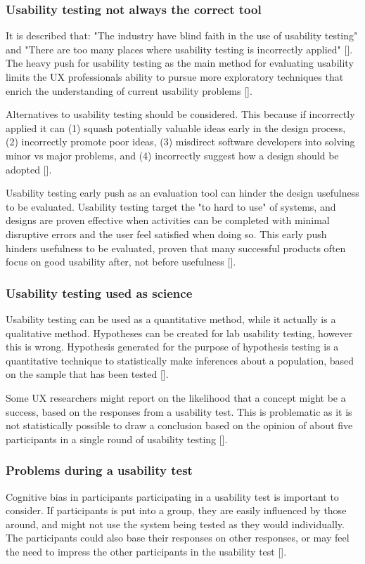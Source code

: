 \subsubsection{Usability testing not always the correct tool}
It is described that: "The industry have blind faith in the use of usability testing" and "There are too many places where usability testing is incorrectly applied" [\cite{pgd_2020}]. The heavy push for usability testing as the main method for evaluating usability limits the UX professionals ability to pursue more exploratory techniques that enrich the understanding of current usability problems [\cite{pgd_2020}]. 

Alternatives to usability testing should be considered. This because if incorrectly applied it can (1) squash potentially valuable ideas early in the design process, (2) incorrectly promote poor ideas, (3) misdirect software developers into solving minor vs major problems, and (4) incorrectly suggest how a design should be adopted [\cite{sg_2008}].

Usability testing early push as an evaluation tool can hinder the design usefulness to be evaluated. Usability testing target the "to hard to use" of systems, and designs are proven effective when activities can be completed with minimal disruptive errors and the user feel satisfied when doing so. This early push hinders usefulness to be evaluated, proven that many successful products often focus on good usability after, not before usefulness [\cite{sg_2008}].

\subsubsection{Usability testing used as science}
Usability testing can be used as a quantitative method, while it actually is a qualitative method. Hypotheses can be created for lab usability testing, however this is wrong. Hypothesis generated for the purpose of hypothesis testing is a quantitative technique to statistically make inferences about a population, based on the sample that has been tested [\cite{pgd_2020}].

Some UX researchers might report on the likelihood that a concept might be a success, based on the responses from a usability test. This is problematic as it is not statistically possible to draw a conclusion based on the opinion of about five participants in a single round of usability testing [\cite{pgd_2020}].

\subsubsection{Problems during a usability test} \label{sec:problems-during-a-usability-test}
Cognitive bias in participants participating in a usability test is important to consider. If participants is put into a group, they are easily influenced by those around, and might not use the system being tested as they would individually. The participants could also base their responses on other responses, or may feel the need to impress the other participants in the usability test [\cite{dn_2016}].

